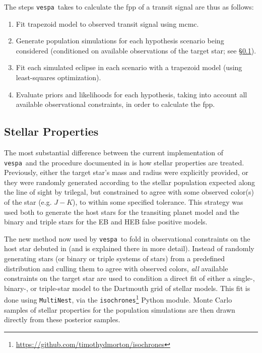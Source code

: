 \documentclass[preprint2]{aastex}
\newcommand{\vespa}{\texttt{vespa}}
\newcommand{\isochrones}{\texttt{isochrones}}
\begin{document}
The steps \vespa\ takes to calculate the \ac{fpp} of a transit signal
are thus as follows:
\begin{enumerate}
\item Fit trapezoid model to observed transit signal using \ac{mcmc}.
\item Generate population simulations for each hypothesis scenario
  being considered (conditioned on available observations of the
  target star; see \S\ref{sec:methods:stellar}).
\item Fit each simulated eclipse in each scenario with a trapezoid
  model (using least-squares optimization).
\item Evaluate priors and likelihoods for each hypothesis, taking into
  account all available observational constraints, in order to
  calculate the \ac{fpp}.
\end{enumerate}


\subsection{Stellar Properties}
\label{sec:methods:stellar}

The most substantial difference between the current implementation of
\vespa\ and the procedure documented in  is
how stellar properties are treated.  Previously, either the target
star's mass and radius were explicitly provided, or they were randomly
generated according to the stellar population expected along the line
of sight by \ac{trilegal}, but constrained to agree with some observed
color(s) of the star (e.g. $J-K$), to within some specified tolerance.
This strategy was used both to generate the host stars for the
transiting planet model and the binary and triple stars for the EB and
HEB false positive models.

The new method now used by \vespa\ to fold in observational
constraints on the host star debuted in \citet{Montet:2015} (and is
explained there in more detail).  Instead of randomly generating stars
(or binary or triple systems of stars) from a predefined distribution and
culling them to agree with observed colors, \emph{all} available
constraints on the target star are used to condition a direct fit of
either a single-, binary-, or triple-star model to the Dartmouth grid
of stellar models.  This fit is done using \texttt{MultiNest}, via the
\isochrones\footnote{\url{https://github.com/timothydmorton/isochrones}}
Python module.  Monte Carlo samples of stellar properties for the
population simulations are then drawn directly from these posterior
samples.  
\end{document}
